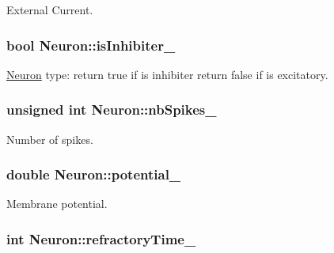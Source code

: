 External Current. 

\hypertarget{classNeuron_a218ea40b8a1fba65ddb5420ac014fa04}{
\subsubsection[{is\-Inhibiter\-\_\-}]{\setlength{\rightskip}{0pt plus 5cm}bool Neuron\-::is\-Inhibiter\-\_\-\hspace{0.3cm}{\ttfamily [private]}}}\label{classNeuron_a218ea40b8a1fba65ddb5420ac014fa04}


\hyperlink{classNeuron}{Neuron} type\-: return true if is inhibiter return false if is excitatory. 

\hypertarget{classNeuron_a372b2a6f32c19f0462a305ab599df0fd}{
\subsubsection[{nb\-Spikes\-\_\-}]{\setlength{\rightskip}{0pt plus 5cm}unsigned int Neuron\-::nb\-Spikes\-\_\-\hspace{0.3cm}{\ttfamily [private]}}}\label{classNeuron_a372b2a6f32c19f0462a305ab599df0fd}


Number of spikes. 

\hypertarget{classNeuron_a91b43a5da7310e83fa2b66bf1be87b66}{
\subsubsection[{potential\-\_\-}]{\setlength{\rightskip}{0pt plus 5cm}double Neuron\-::potential\-\_\-\hspace{0.3cm}{\ttfamily [private]}}}\label{classNeuron_a91b43a5da7310e83fa2b66bf1be87b66}


Membrane potential. 

\hypertarget{classNeuron_a28159eb51ce5e6a17d499d370b7e3db4}{
\subsubsection[{refractory\-Time\-\_\-}]{\setlength{\rightskip}{0pt plus 5cm}int Neuron\-::refractory\-Time\-\_\-\hspace{0.3cm}{\ttfamily [private]}}}\label{classNeuron_a28159eb51ce5e6a17d499d370b7e3db4}


